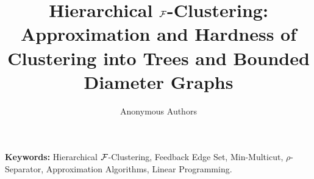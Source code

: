\documentclass[11pt]{article}
\title{Hierarchical $\mathcal{F}$-Clustering: Approximation and Hardness of Clustering into Trees and Bounded Diameter Graphs}
\author{Anonymous Authors}
\date{}
\theoremstyle{definition}
\begin{document}
\maketitle



\noindent
\textbf{Keywords:} Hierarchical $\mathcal{F}$-Clustering, Feedback Edge Set, Min-Multicut, $\rho$-Separator, Approximation Algorithms, Linear Programming.

\bigskip















\end{document}
